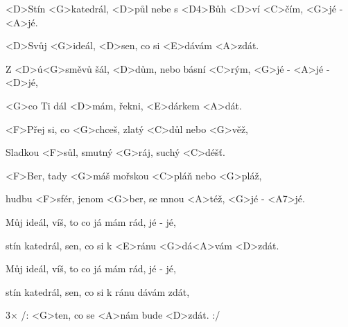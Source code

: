 

\zs
<D>Stín <G>katedrál, <D>půl nebe s <D4>Bůh <D>ví <C>čím, <G>jé - <A>jé.

<D>Svůj <G>ideál, <D>sen, co si <E>dávám <A>zdát.

Z <D>ú<G>směvů šál, <D>dům, nebo básní <C>rým, <G>jé - <A>jé - <D>jé,

<G>co Ti dál <D>mám, řekni, <E>dárkem <A>dát.
\ks

\zr
<F>Přej si, co <G>chceš, zlatý <C>důl nebo <G>věž,

Sladkou <F>sůl, smutný <G>ráj, suchý <C>déšť.

<F>Ber, tady <G>máš mořskou <C>pláň nebo <G>pláž,

hudbu <F>sfér, jenom <G>ber, se mnou <A>též, <G>jé - <A7>jé.
\kr

\zs
Můj ideál, víš, to co já mám rád, jé - jé,

stín katedrál, sen, co si k <E>ránu <G>dá<A>vám <D>zdát.
\ks

\zr\kr

\zs
Můj ideál, víš, to co já mám rád, jé - jé,

stín katedrál, sen, co si k ránu dávám zdát,

3× /: <G>ten, co se <A>nám bude <D>zdát. :/
\ks

\kp
